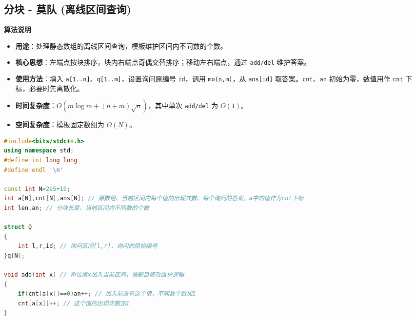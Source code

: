 \documentclass[10pt,landscape,a4paper]{article}
\begin{document}
\begin{multicols*}{3}
\subsection*{分块 - 莫队 (离线区间查询)}
\par\addvspace{0.7ex}\noindent\textbf{算法说明}\par\nobreak
\begin{itemize}
\item \textbf{用途}：处理静态数组的离线区间查询，模板维护区间内不同数的个数。
\item \textbf{核心思想}：左端点按块排序，块内右端点奇偶交替排序；移动左右端点，通过 \texttt{a\allowbreak{}d\allowbreak{}d\allowbreak{}/\allowbreak{}d\allowbreak{}e\allowbreak{}l} 维护答案。
\item \textbf{使用方法}：填入 \texttt{a\allowbreak{}[\allowbreak{}1\allowbreak{}.\allowbreak{}.\allowbreak{}n\allowbreak{}]}、\texttt{q\allowbreak{}[\allowbreak{}1\allowbreak{}.\allowbreak{}.\allowbreak{}m\allowbreak{}]}，设置询问原编号 \texttt{i\allowbreak{}d}，调用 \texttt{m\allowbreak{}o\allowbreak{}(\allowbreak{}n\allowbreak{},\allowbreak{}m\allowbreak{})}，从 \texttt{a\allowbreak{}n\allowbreak{}s\allowbreak{}[\allowbreak{}i\allowbreak{}d\allowbreak{}]} 取答案。\texttt{c\allowbreak{}n\allowbreak{}t}、\texttt{a\allowbreak{}n} 初始为零，数值用作 \texttt{c\allowbreak{}n\allowbreak{}t} 下标，必要时先离散化。
\item \textbf{时间复杂度}：$O(m\log m+(n+m)\sqrt n)$，其中单次 \texttt{a\allowbreak{}d\allowbreak{}d\allowbreak{}/\allowbreak{}d\allowbreak{}e\allowbreak{}l} 为 $O(1)$。
\item \textbf{空间复杂度}：模板固定数组为 $O(N)$。
\end{itemize}
\par{}\par
\begin{lstlisting}[language=C++]
#include<bits/stdc++.h>
using namespace std;
#define int long long
#define endl '\n'

const int N=2e5+10;
int a[N],cnt[N],ans[N]; // 原数组、当前区间内每个值的出现次数、每个询问的答案，a中的值作为cnt下标
int len,an; // 分块长度、当前区间内不同数的个数

struct Q
{
    int l,r,id; // 询问区间[l,r]、询问的原始编号
}q[N];

void add(int x) // 将位置x加入当前区间，按题目修改维护逻辑
{
    if(cnt[a[x]]==0)an++; // 加入前没有这个值，不同数个数加1
    cnt[a[x]]++; // 这个值的出现次数加1
}


\end{lstlisting}
\end{multicols*}
\end{document}
